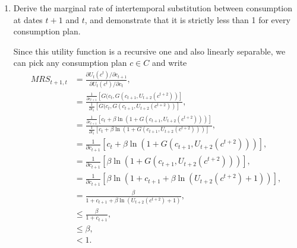 \documentclass[11pt,english]{article}
\begin{document}
\begin{enumerate}[label = (\alph*)]
\begin{solution}
One note is that instead of using the mean value theorem, we can use the property that $\ln(1 + x) < x$ for all $x >0$. Specifically, we can write $B = \beta\ln(U_{t+2}(\bar{c}^{t+2}) + 1)$, which we know is greater than $0$, and then define $C_w =  \beta\ln(U_{t+2}(\bar{c}^{t+2}) + 1) + w$ and $C_y = \beta\ln(U_{t+2}(\bar{c}^{t+2}) + 1) + y$. This let's us write both of the expressions
\begin{align*}
\ln(1 + C_w) < C_w &\implies \beta\ln(1 + C_w) < C_w\\
\ln(1 + C_y) < C_y &\implies \beta\ln(1 + C_y) < C_y
\end{align*}Subtracting these two expressions gives $$w - y > \beta[\ln(1 + C_w) - \ln(1 + C_y)],$$ which is exactly the expression we needed to prove above.
\end{solution}
    \item Derive the marginal rate of intertemporal substitution between consumption at dates $t+1$ and $t$, and demonstrate that it is strictly less than 1 for every consumption plan.
\begin{solution}
Since this utility function is a recursive one and also linearly separable, we can pick any consumption plan $c\in C$ and write
\begin{align*}
MRS_{t+1,t} &= \frac{\partial U_t(c^t)/\partial c_{t+1}}{\partial U_t(c^t)/\partial c_{t}},\\
&= \frac{\frac{1}{\partial c_{t+1}}\left[G(c_t, G(c_{t+1}, U_{t+2}(c^{t+2}))\right]}{\frac{1}{\partial c_{t}}\left[G(c_t, G(c_{t+1}, U_{t+2}(c^{t+2}))\right]},\\
&= \frac{\frac{1}{\partial c_{t+1}}\left[c_t + \beta\ln(1 + G(c_{t+1}, U_{t+2}(c^{t+2})))\right]}{\frac{1}{\partial c_{t}}\left[c_t + \beta\ln(1 + G(c_{t+1}, U_{t+2}(c^{t+2})))\right]},\\
&= \frac{1}{\partial c_{t+1}}\left[c_t + \beta\ln(1 + G(c_{t+1}, U_{t+2}(c^{t+2})))\right],\\
&= \frac{1}{\partial c_{t+1}}\left[\beta\ln(1 + G(c_{t+1}, U_{t+2}(c^{t+2})))\right],\\
&= \frac{1}{\partial c_{t+1}}\left[\beta\ln(1 + c_{t+1} + \beta\ln(U_{t+2}(c^{t+2}) + 1))\right],\\
&= \frac{\beta}{1 + c_{t+1} + \beta\ln(U_{t+2}(c^{t+2}) + 1)},\\
&\leq \frac{\beta}{1 + c_{t+1}},\\
&\leq \beta,\\
&< 1.
\end{align*}
\end{solution}
\end{enumerate}
\end{document}
